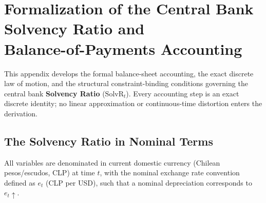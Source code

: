 
\section[Formalization of Solvency Ratio and Balance-of-Payments Accounting]{Formalization of the Central Bank Solvency Ratio and\\Balance-of-Payments Accounting}
\label{app:bop_levr}

This appendix develops the formal balance-sheet accounting, the exact discrete law of motion, and the structural constraint-binding conditions governing the central bank \textbf{Solvency Ratio} ($\text{SolvR}_t$). Every accounting step is an exact discrete identity; no linear approximation or continuous-time distortion enters the derivation.

\subsection{The Solvency Ratio in Nominal Terms}
\label{app:solvr_nominal}

All variables are denominated in current domestic currency (Chilean pesos/escudos, CLP) at time $t$, with the nominal exchange rate convention defined as $e_t$ (CLP per USD), such that a nominal depreciation corresponds to $e_t \uparrow$.

